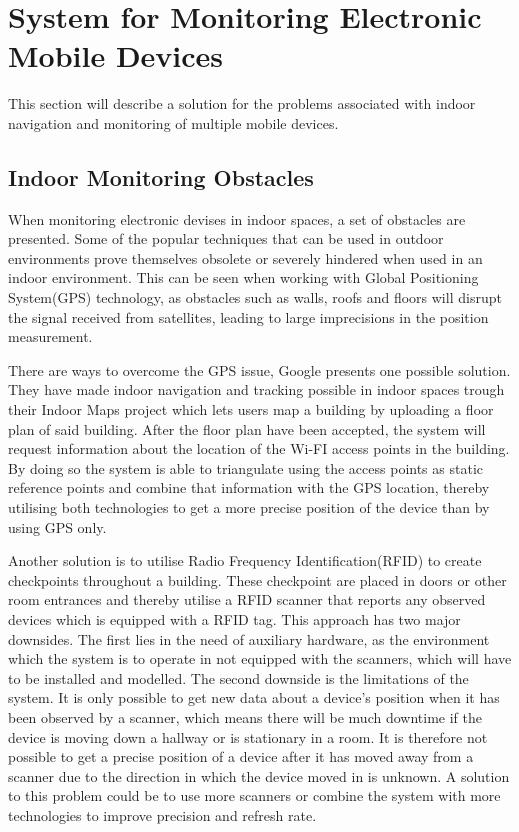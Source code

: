 \section{System for Monitoring Electronic Mobile Devices}\label{sec:monitoring}
This section will describe a solution for the problems associated with indoor navigation and monitoring of multiple mobile devices.

\subsection{Indoor Monitoring Obstacles}
When monitoring electronic devises in indoor spaces, a set of obstacles are presented. Some of the popular techniques that can be used in outdoor environments prove themselves obsolete or severely hindered when used in an indoor environment. This can be seen when working with Global Positioning System(GPS) technology, as obstacles such as walls, roofs and floors will disrupt the signal received from satellites, leading to large imprecisions in the position measurement.

There are ways to overcome the GPS issue, Google presents one possible solution. They have made indoor navigation and tracking possible in indoor spaces trough their Indoor Maps project \cite{IPSoverGPS} which lets users map a building by uploading a floor plan of said building. After the floor plan have been accepted, the system will request information about the location of the Wi-FI access points in the building. By doing so the system is able to triangulate using the access points as static reference points and combine that information with the GPS location, thereby utilising both technologies to get a more precise position of the device than by using GPS only.

Another solution is to utilise Radio Frequency Identification(RFID) to create checkpoints throughout a building. These checkpoint are placed in doors or other room entrances and thereby utilise a RFID scanner that reports any observed devices which is equipped with a RFID tag\cite{indoor_bin}. %
This approach has two major downsides. The first lies in the need of auxiliary hardware, as the environment which the system is to operate in not equipped with the scanners, which will have to be installed and modelled. The second downside is the limitations of the system. It is only possible to get new data about a device's position when it has been observed by a scanner, which means there will be much downtime if the device is moving down a hallway or is stationary in a room. It is therefore not possible to get a precise position of a device after it has moved away from a scanner due to the direction in which the device moved in is unknown. A solution to this problem could be to use more scanners or combine the system with more technologies to improve precision and refresh rate.

